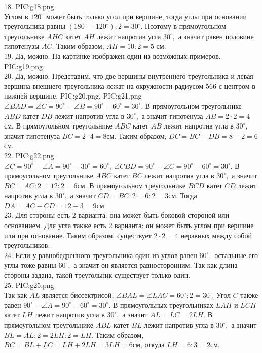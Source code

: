 18. {{PIC:g18.png}}\\
Углом в $120^\circ$ может быть только угол при вершине, тогда углы при основании треугольника равны $(180^\circ-120^\circ):2=30^\circ.$ Поэтому в прямоугольном треугольнике $AHC$ катет $AH$ лежит напротив угла $30^\circ,$ а значит равен половине гипотенузы $AC.$ Таким образом, $AH=10:2=5$ см.\\
19. Да, можно. На картинке изображён один из возможных примеров.
{{PIC:g19.png}}\\
20. Да, можно. Представим, что две вершины внутреннего треугольника и левая вершина внешнего треугольника лежат на окружности радиусом 566 с центром в нижней вершине.
{{PIC:g20.png}}\newpage{}. {{PIC:g21.png}}\\
$\angle BAD=\angle C=90^\circ-\angle B=90^\circ-60^\circ=30^\circ.$ В прямоугольном треугольнике $ABD$ катет $DB$ лежит напротив угла в $30^\circ,$ а значит гипотенуза $AB=2\cdot2=4$см. В прямоугольном треугольнике $ABC$ катет $AB$ лежит напротив угла в $30^\circ,$ значит гипотенуза $BC=2\cdot4=8$см. Таким образом, $DC=BC-DB=8-2=6$см.\\
22. {{PIC:g22.png}}\\
$\angle C=90^\circ-\angle A=90^\circ-30^\circ=60^\circ,\ \angle CBD=90^\circ-\angle C=90^\circ-60^\circ=30^\circ.$ В прямоугольном треугольнике $ABC$ катет $BC$ лежит напротив угла в $30^\circ,$ а значит $BC=AC:2=12:2=6$см. В прямоугольном треугольнике $BCD$ катет $CD$ лежит напротив угла в $30^\circ,$ а значит $CD=BC:2=6:2=3$см. Тогда $DA=AC-CD=12-3=9$см.\\
23. Для стороны есть 2 варианта: она может быть боковой стороной или основанием. Для угла также есть 2 варианта: он может быть углом при вершине или при основание. Таким образом, существует $2\cdot2=4$ неравных между собой треугольников.\\
24. Если у равнобедренного треугольника один из углов равен $60^\circ,$ остальные его углы тоже равны $60^\circ,$ а значит он является равносторонним. Так как длина стороны задана, такой треугольник существует только один.\\
25. {{PIC:g25.png}}\\
Так как $AL$ является биссектрисой, $\angle BAL=\angle LAC=60^\circ:2=30^\circ.$ Угол $C$ также равен $90^\circ-\angle A=90^\circ-60^\circ=30^\circ.$ В прямоугольных треугольниках $LAH$ и $LCH$ катет $LH$ лежит напротив угла в $30^\circ,$ а значит $AL=LC=2LH.$ В прямоугольном треугольнике $ABL$ катет $BL$ лежит напротив угла
в $30^\circ,$ а значит $BL=AL:2=2LH:2=LH.$ Таким образом, $BC=BL+LC=LH+2LH=3LH=6$см, откуда $LH=6:3=2$см.\newpage\noindent
